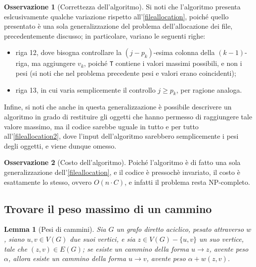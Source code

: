 \documentclass[14pt]{extreport}
\newtheorem{lemma}{Lemma}[subsection]
\theoremstyle{definition}
\theoremstyle{definition}
\newtheorem{remark}{Osservazione}[subsection]
\begin{document}
\begin{remark}[Correttezza dell'algoritmo]
    Si noti che l'algoritmo presenta eslcusivamente qualche variazione rispetto all'\cref{fileallocation}, poiché quello presentato è una sola generalizzazione del problema dell'allocazione dei file, precedentemente discusso; in particolare, variano le seguenti righe:

    \begin{itemize}
        \item riga 12, dove bisogna controllare la $(j - p_k)$-esima colonna della $(k -1)$-riga, ma aggiungere $v_k$, poiché \texttt{T} contiene i valori massimi possibili, e non i pesi (si noti che nel problema precedente pesi e valori erano coincidenti);
        \item riga 13, in cui varia semplicemente il controllo $j \ge p_k$, per ragione analoga.
    \end{itemize}

    Infine, si noti che anche in questa generalizzazione è possibile descrivere un algoritmo in grado di restituire gli oggetti che hanno permesso di raggiungere tale valore massimo, ma il codice sarebbe uguale in tutto e per tutto all'\cref{fileallocation2}, dove l'input dell'algoritmo sarebbero semplicemente i pesi degli oggetti, e viene dunque omesso.
\end{remark}

\begin{remark}[Costo dell'algoritmo]
    Poiché l'algoritmo è di fatto una sola generalizzazione dell'\cref{fileallocation}, e il codice è pressochè invariato, il costo è esattamente lo stesso, ovvero $O(n \cdot C)$, e infatti il problema resta NP-completo.
\end{remark}

\subsection{Trovare il peso massimo di un cammino}

\begin{lemma}[Pesi di cammini]
    \label{lemma grafi max}
    Sia $G$ un grafo diretto aciclico, pesato attraverso $w$, siano $u, v \in V(G)$ due suoi vertici, e sia $z \in V(G) - \{u, v\}$ un suo vertice, tale che $(z, v) \in E(G)$; se esiste un cammino della forma $u \rightarrow z$, avente peso $\alpha$, allora esiste un cammino della forma $u \rightarrow v$, avente peso $\alpha + w(z, v)$.
\end{lemma}
\end{document}
